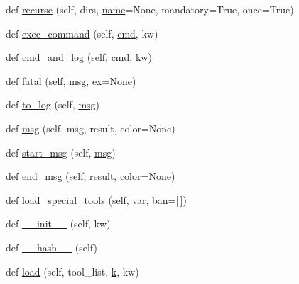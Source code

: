 \begin{DoxyCompactItemize}
\item 
def \hyperlink{classwaflib_1_1_context_1_1_context_a10e3b0d5e63bb03a0a7adbb32c3dceab}{recurse} (self, dirs, \hyperlink{lib_2expat_8h_a1b49b495b59f9e73205b69ad1a2965b0}{name}=None, mandatory=True, once=True)
\item 
def \hyperlink{classwaflib_1_1_context_1_1_context_aaa7d209a0d05f2f8e45fc11b83c72dba}{exec\+\_\+command} (self, \hyperlink{sndfile__play_8m_adfc5ba7e22f5e4a6221c12a70503bef3}{cmd}, kw)
\item 
def \hyperlink{classwaflib_1_1_context_1_1_context_aaa63c5a7ac60f1bf164febe6642d270f}{cmd\+\_\+and\+\_\+log} (self, \hyperlink{sndfile__play_8m_adfc5ba7e22f5e4a6221c12a70503bef3}{cmd}, kw)
\item 
def \hyperlink{classwaflib_1_1_context_1_1_context_a42739307965d7ef470985d7bb7408788}{fatal} (self, \hyperlink{classwaflib_1_1_context_1_1_context_a7495a2e04e528aa54bda3cadf08240cb}{msg}, ex=None)
\item 
def \hyperlink{classwaflib_1_1_context_1_1_context_a596fa2d8dc5a61602101f43ec1eb3e7e}{to\+\_\+log} (self, \hyperlink{classwaflib_1_1_context_1_1_context_a7495a2e04e528aa54bda3cadf08240cb}{msg})
\item 
def \hyperlink{classwaflib_1_1_context_1_1_context_a7495a2e04e528aa54bda3cadf08240cb}{msg} (self, msg, result, color=None)
\item 
def \hyperlink{classwaflib_1_1_context_1_1_context_a344a0dff2c7b0d2d76057d55b83c3f16}{start\+\_\+msg} (self, \hyperlink{classwaflib_1_1_context_1_1_context_a7495a2e04e528aa54bda3cadf08240cb}{msg})
\item 
def \hyperlink{classwaflib_1_1_context_1_1_context_a6340799a7fa4dc1230d13b7c08eec789}{end\+\_\+msg} (self, result, color=None)
\item 
def \hyperlink{classwaflib_1_1_context_1_1_context_a95a53e6c363450df77f847bec6c56696}{load\+\_\+special\+\_\+tools} (self, var, ban=\mbox{[}$\,$\mbox{]})
\item 
def \hyperlink{classwaflib_1_1_context_1_1_context_ab8fabf802b21a8a8e77c3e3811c58c84}{\+\_\+\+\_\+init\+\_\+\+\_\+} (self, kw)
\item 
def \hyperlink{classwaflib_1_1_context_1_1_context_ae8096e428213ed965d8cd5629c2481a1}{\+\_\+\+\_\+hash\+\_\+\+\_\+} (self)
\item 
def \hyperlink{classwaflib_1_1_context_1_1_context_ad214db6a7b3ce05051972f7d073a74f2}{load} (self, tool\+\_\+list, \hyperlink{rfft2d_test_m_l_8m_adc468c70fb574ebd07287b38d0d0676d}{k}, kw)
\item 

\end{DoxyCompactItemize}
